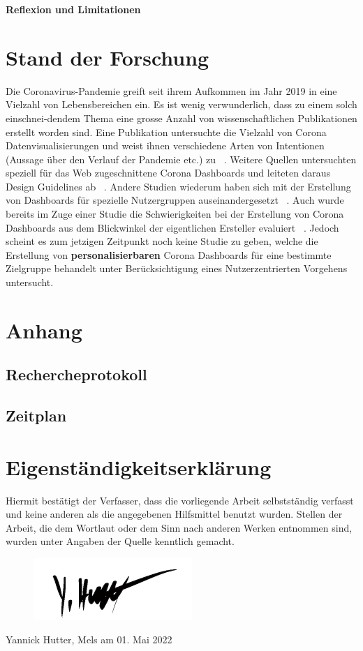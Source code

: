 \documentclass[12pt, oneside]{article}
\begin{document}
\textbf{Reflexion und Limitationen}

\clearpage
\section{Stand der Forschung}
Die Coronavirus-Pandemie greift seit ihrem Aufkommen im Jahr 2019 in eine Vielzahl von Lebensbereichen ein. Es ist wenig verwunderlich, dass zu einem solch einschnei-dendem Thema eine grosse Anzahl von wissenschaftlichen Publikationen erstellt worden sind. Eine Publikation untersuchte die Vielzahl von Corona Datenvisualisierungen und weist ihnen verschiedene Arten von Intentionen (Aussage über den Verlauf der Pandemie etc.) zu ~\citep{YixuanZhang.}. Weitere Quellen untersuchten speziell für das Web zugeschnittene Corona Dashboards und leiteten daraus Design Guidelines ab ~\citep{Ivankovic.2021}. Andere Studien wiederum haben sich mit der Erstellung von Dashboards für spezielle Nutzergruppen auseinandergesetzt ~\citep{Ivanov.2018}. Auch wurde bereits im Zuge einer Studie die Schwierigkeiten bei der Erstellung von Corona Dashboards aus dem Blickwinkel der eigentlichen Ersteller evaluiert ~\citep{Barbazza.}. Jedoch scheint es zum jetzigen Zeitpunkt noch keine Studie zu geben, welche die Erstellung von \textbf{personalisierbaren} Corona Dashboards für eine bestimmte Zielgruppe behandelt unter Berücksichtigung eines Nutzerzentrierten Vorgehens untersucht.

\clearpage
\section*{Anhang}
\subsection*{Rechercheprotokoll}


\subsection*{Zeitplan}

\clearpage
\section*{Eigenständigkeitserklärung}
Hiermit bestätigt der Verfasser, dass die vorliegende Arbeit selbstständig verfasst und keine anderen als die angegebenen Hilfsmittel benutzt wurden. Stellen der Arbeit, die dem Wortlaut oder dem Sinn nach anderen Werken entnommen sind, wurden unter Angaben der Quelle kenntlich gemacht.

\begin{figure}[ht]
	\includegraphics[width=6cm]{images/signature.png}
\end{figure}
Yannick Hutter, Mels am 01. Mai 2022

\clearpage


\end{document}
